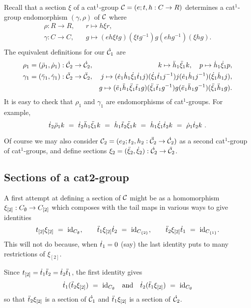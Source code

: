 \bigskip
Recall that a section $\xi$ of a cat$^1$-group 
$\mathcal{C} = (e;t,h : C \to R)$ determines a cat$^1$-group endomorphism 
$(\gamma,\rho)$ of $\mathcal{C}$ where
\begin{eqnarray*}
  \rho : R \to R, && r \mapsto h \xi r, \\
\gamma : C \to C, && g \mapsto (eh \xi tg)(\xi tg^{-1})g(ehg^{-1})(\xi hg). \\
\end{eqnarray*}
The equivalent definitions for our $\dot{\mathcal{C}}_1$ are
\begin{eqnarray*}
\rho_1 = (\ddot{\rho}_1,\dot{\rho}_1): \dot{\mathcal{C}}_2 \to \dot{\mathcal{C}}_2, 
  & &  k \mapsto \ddot{h}_1 \ddot{\xi}_1 k, \quad
       p \mapsto \dot{h}_1 \dot{\xi}_1 p, \\
\gamma_1 = (\ddot{\gamma}_1,\dot{\gamma}_1) : \ddot{\mathcal{C}}_2 \to \ddot{\mathcal{C}}_2, 
  & &  j \mapsto (\dot{e}_1\dot{h}_1\dot{\xi}_1\dot{t}_1 j)(\dot{\xi}_1\dot{t}_1 j^{-1})j
                 (\dot{e}_1\dot{h}_1 j^{-1})(\dot{\xi}_1\dot{h}_1 j), \\
  & &  g \mapsto (\ddot{e}_1\ddot{h}_1\ddot{\xi}_1\ddot{t}_1 g)(\ddot{\xi}_1\ddot{t}_1 g^{-1})g
                 (\ddot{e}_1\ddot{h}_1 g^{-1})(\ddot{\xi}_1\ddot{h}_1 g).
\end{eqnarray*}
It is easy to check that $\rho_1$ and $\gamma_1$ are endomorphisms 
of cat$^1$-groups.  For example,
$$
\dot{t}_2\ddot{\rho}_1 k ~=~
\dot{t}_2\ddot{h}_1\ddot{\xi}_1 k ~=~
\dot{h}_1\ddot{t}_2\ddot{\xi}_1 k ~=~
\dot{h}_1\dot{\xi}_1\dot{t}_2 k ~=~
\dot{\rho}_1\dot{t}_2 k~.
$$

Of course we may also consider 
$\mathcal{C}_2 = (e_2;t_2,h_2 : \ddot{\mathcal{C}}_2 \to \dot{\mathcal{C}}_2)$ 
as a second cat$^1$-group of cat$^1$-groups, and define 
sections $\xi_2 = (\ddot{\xi}_2,\dot{\xi}_2) : \dot{\mathcal{C}}_2 \to \ddot{\mathcal{C}}_2$.



\subsection{Sections of a cat2-group}

A first attempt at defining a section of $\mathcal{C}$ 
might be as a homomorphism $\xi_{[2]} : C_{\emptyset} \to C_{[2]}$ 
which composes with the tail maps in various ways to give identities
$$
t_{[2]}\xi_{[2]} ~=~ \mathrm{id}_{C_{\emptyset}}, \qquad
\ddot{t}_1\xi_{[2]}\dot{t}_2 ~=~ \mathrm{id}_{C_{\{2\}}}, \qquad
\ddot{t}_2\xi_{[2]}\dot{t}_1 ~=~ \mathrm{id}_{C_{\{1\}}}.
$$
This will not do because, when $\dot{t}_1 = 0$ (say)
the last identity puts to many restrictions of $\xi_{[2]}$.

\noindent
Since $t_{[2]} = \dot{t}_1\ddot{t}_2 = \dot{t}_2\ddot{t}_1$, the first identity gives 
$$
\dot{t}_1(\ddot{t}_2\xi_{[2]})  ~=~ \mathrm{id}_{C_{\emptyset}}
\quad\mbox{and}\quad
\dot{t}_2(\ddot{t}_1\xi_{[2]})  ~=~ \mathrm{id}_{C_{\emptyset}}
$$
so that $\ddot{t}_2\xi_{[2]}$ is a section of $\dot{\mathcal{C}}_1$ 
and $\ddot{t}_1\xi_{[2]}$ is a section of $\dot{\mathcal{C}}_2$.

